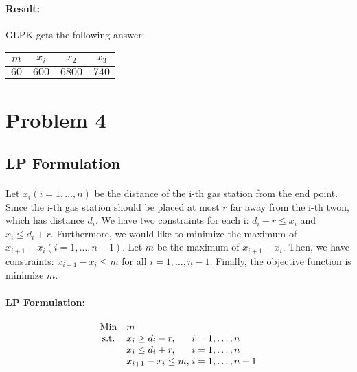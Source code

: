 \documentclass[]{article}
\begin{document}
        \paragraph{Result:} GLPK gets the following answer:
\begin{table}[h!]
            \centering            
            \begin{tabular}{*{4}{c}}
            \hline
$m$ & $x_i$ & $x_2$ & $x_3$ \\
\hline
$60$ & $600$ & $6800$ & $740$ \\
            \hline            
            \end{tabular}
\end{table}
    \section{Problem 4}
        \subsection{LP Formulation}
        \paragraph{}Let $x_i(i=1,\dots,n)$ be the distance of the i-th gas station from the end point. Since the i-th gas station should be placed at most $r$ far away from the i-th twon, which has distance $d_i$. We have two constraints for each i: $d_i - r \leq x_i$ and $x_i \leq d_i + r$. Furthermore, we would like to minimize the maximum of $x_{i+1} - x_i(i = 1,\dots,n-1)$. Let $m$ be the maximum of $x_{i+1} - x_i$. Then, we have constraints: $x_{i+1} - x_i \leq m$ for all $i = 1,\dots,n-1$. Finally, the objective function is minimize $m$. 
        \paragraph{LP Formulation:} 
        \begin{equation*}
\begin{array}{cl@{}ll}
\text{Min}  & m &\\
\text{s.t.} & x_i \geq d_i - r,\;  & i=1,\dots,n  \\
            & x_i \leq d_i + r,\;  & i=1,\dots,n  \\
            & x_{i+1} - x_i \leq m,\; & i = 1,\dots,n-1 \\
            
\end{array}
        \end{equation*}
    
\end{document}
